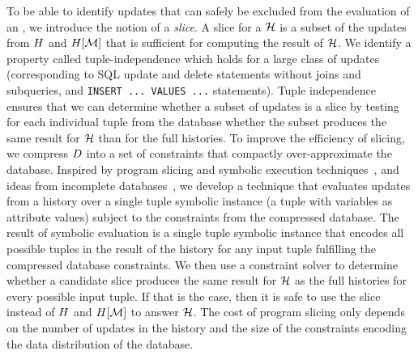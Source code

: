 To be able to identify updates that can safely be excluded from the evaluation of an \abbrHW, we introduce the notion of a \emph{slice}. A slice for a \abbrHW $\mathcal{H}$ is a subset of the updates from $H$ and $H[\mathcal{M}]$ that is sufficient for computing the result of $\mathcal{H}$. We identify a property called tuple-independence which holds for a large class of updates (corresponding to SQL update and delete statements without joins and subqueries, and \lstinline!INSERT ... VALUES ...! statements). Tuple independence ensures that we can determine whether a subset of updates is a slice by testing for each individual tuple from the database whether the subset produces the same result for $\mathcal{H}$ than for the full histories. To improve the efficiency of slicing, we compress $D$ into a set of constraints that compactly over-approximate the database. Inspired by program slicing and symbolic execution techniques~\cite{bucur14,luckow14}, and ideas from incomplete databases~\cite{AG85,IL84a}, we develop a technique that evaluates updates from a history over a single tuple symbolic instance (a tuple with variables as attribute values) subject to the constraints from the compressed database. The result of symbolic evaluation is a single tuple symbolic instance that encodes all possible tuples in the result of the history for any input tuple fulfilling the compressed database constraints. We then use a constraint solver %
  to determine whether a candidate slice produces the same result for $\mathcal{H}$ as the full histories for every possible input tuple. If that is the case, then it is safe to use the slice instead of $H$ and $H[\mathcal{M}]$ to answer $\mathcal{H}$.
The cost of program slicing only depends on the number of updates in the history and the size of the constraints encoding the data distribution of the database. %



